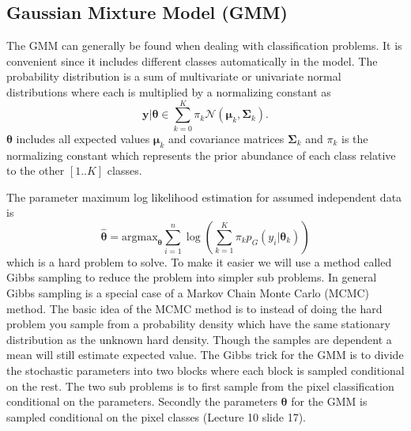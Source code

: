 \documentclass[a4paper,english]{article}
\begin{document}
\subsection{Gaussian Mixture Model (GMM)}
The GMM can generally be found when dealing with classification problems.
It is convenient since it includes different classes automatically in the model.
The probability distribution is a sum of multivariate or univariate normal distributions where each is multiplied by a normalizing constant as
\begin{equation}
  \boldsymbol{y} | \boldsymbol{\theta} \in \sum_{k = 0}^K \pi_k \mathcal{N}(\boldsymbol{\mu}_k, \boldsymbol{\Sigma}_k).
  \label{eq:gmm}
\end{equation}
$\boldsymbol{\theta}$ includes all expected values $\boldsymbol{\mu}_k$ and covariance matrices $\boldsymbol{\Sigma}_k$ and $\pi_k$ is the normalizing constant which represents the prior abundance of each class relative to the other $[1..K]$ classes.

The parameter maximum log likelihood estimation for assumed independent data is
\begin{equation}
  \hat{\boldsymbol{\theta}} = \text{argmax}_{\boldsymbol{\theta}} \sum_{i = 1}^n \log \left(  \sum_{k=1}^K \pi_k p_G(y_i | \boldsymbol{\theta}_k) \right)
\end{equation}
which is a hard problem to solve.
To make it easier we will use a method called Gibbs sampling to reduce the problem into simpler sub problems.
In general Gibbs sampling is a special case of a Markov Chain Monte Carlo (MCMC) method.
The basic idea of the MCMC method is to instead of doing the hard problem you sample from a probability density which have the same stationary distribution as the unknown hard density.
Though the samples are dependent a mean will still estimate expected value.
The Gibbs trick for the GMM is to divide the stochastic parameters into two blocks where each block is sampled conditional on the rest.
The two sub problems is to first sample from the pixel classification conditional on the parameters.
Secondly the parameters $\boldsymbol{\theta}$ for the GMM is sampled conditional on the pixel classes (Lecture 10 slide 17\cite{L10}).
\end{document}
